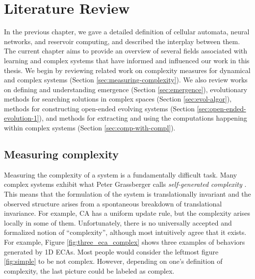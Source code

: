 \chapter{Literature Review}
\label{cha:literature-review}

In the previous chapter, we gave a detailed definition of cellular 
automata, neural networks, and reservoir computing, and described the interplay 
between them. The current chapter aims to 
provide an overview of several fields associated with learning and complex
systems that have informed and influenced our work in this thesis. We begin by reviewing related
work on complexity measures for dynamical and complex systems (Section
\ref{sec:measuring-complexity}). We also review works on defining and
understanding emergence (Section \ref{sec:emergence}), evolutionary methods for
searching solutions in complex spaces (Section \ref{sec:evol-algor}), methods
for constructing open-ended evolving systems (Section
\ref{sec:open-ended-evolution-1}), and methods for extracting and using the
computations happening within complex systems (Section
\ref{sec:comp-with-compl}).

\section{Measuring complexity\label{sec:measuring-complexity}}

Measuring the complexity of a system is a fundamentally difficult task. Many
complex systems exhibit what Peter Grassberger calls \emph{self-generated
  complexity} \parencite{grassbergerQuantitativeTheorySelfgenerated1986}. This
means that the formulation of the system is translationally invariant and the
observed structure arises from a spontaneous breakdown of translational
invariance. For example, \ac{CA} has a uniform update rule, but the complexity 
arises locally in some of them. Unfortunately, there is no universally accepted and formalized notion
of ``complexity'', although most intuitively agree that it exists. For
example, Figure \ref{fig:three_eca_complex} shows three examples of behaviors
generated by 1D \acp{ECA}. Most people would consider the leftmost figure
\ref{fig:simple} to be not complex. However, depending on one's definition of
complexity, the last picture could be labeled as complex.

